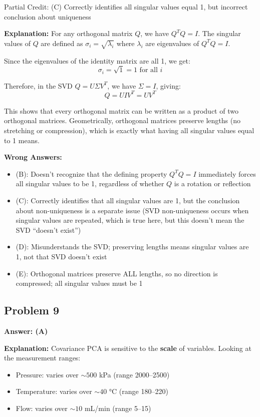 \documentclass[12pt]{amsart}
\newcommand{\correct}[1]{{\color{correctgreen}\textbf{#1}}}
\newcommand{\partcred}[1]{{\color{partialblue}#1}}
\begin{document}
\begin{itemize}
\partcred{Partial Credit: (C) Correctly identifies all singular values equal 1, but incorrect conclusion about uniqueness}

\textbf{Explanation:} For any orthogonal matrix $Q$, we have $Q^T Q = I$. The singular values of $Q$ are defined as $\sigma_i = \sqrt{\lambda_i}$ where $\lambda_i$ are eigenvalues of $Q^T Q = I$. 

Since the eigenvalues of the identity matrix are all 1, we get:
$$\sigma_i = \sqrt{1} = 1 \text{ for all } i$$

Therefore, in the SVD $Q = U\Sigma V^T$, we have $\Sigma = I$, giving:
$$Q = U I V^T = UV^T$$

This shows that every orthogonal matrix can be written as a product of two orthogonal matrices. Geometrically, orthogonal matrices preserve lengths (no stretching or compression), which is exactly what having all singular values equal to 1 means.

\textbf{Wrong Answers:}
\begin{itemize}
\item (B): Doesn't recognize that the defining property $Q^T Q = I$ immediately forces all singular values to be 1, regardless of whether $Q$ is a rotation or reflection
\item (C): Correctly identifies that all singular values are 1, but the conclusion about non-uniqueness is a separate issue (SVD non-uniqueness occurs when singular values are repeated, which is true here, but this doesn't mean the SVD ``doesn't exist'')
\item (D): Misunderstands the SVD; preserving lengths means singular values are 1, not that SVD doesn't exist
\item (E): Orthogonal matrices preserve ALL lengths, so no direction is compressed; all singular values must be 1
\end{itemize}

\subsection*{Problem 9}
\correct{Answer: (A)}

\textbf{Explanation:} Covariance PCA is sensitive to the \textbf{scale} of variables. Looking at the measurement ranges:
\begin{itemize}
\item Pressure: varies over $\sim 500$ kPa (range 2000--2500)
\item Temperature: varies over $\sim 40$ °C (range 180--220)
\item Flow: varies over $\sim 10$ mL/min (range 5--15)
\end{itemize}


\end{itemize}
\end{document}
